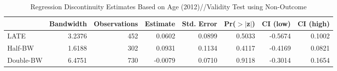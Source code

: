 \begin{table}[ht]
\centering
\begin{tabular}{lrrrrrrr}
  \hline
 & Bandwidth & Observations & Estimate & Std. Error & Pr($>$$|$z$|$) & CI (low) & CI (high) \\ 
  \hline
LATE & 3.2376 & 452 & 0.0602 & 0.0899 & 0.5033 & -0.5674 & 0.1002 \\ 
  Half-BW & 1.6188 & 302 & 0.0931 & 0.1134 & 0.4117 & -0.4169 & 0.0821 \\ 
  Double-BW & 6.4751 & 730 & -0.0079 & 0.0710 & 0.9118 & -0.3014 & 0.1654 \\ 
   \hline
\end{tabular}
\caption{Regression Discontinuity Estimates Based on Age (2012)//Validity Test using Non-Outcome} 
\label{tab:rd2012y_non}
\end{table}
